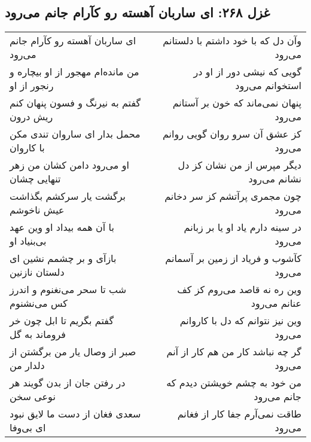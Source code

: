 \begin{center}
\section*{غزل ۲۶۸: ای ساربان آهسته رو کآرام جانم می‌رود}
\label{sec:268}
\begin{longtable}{l p{0.5cm} r}
ای ساربان آهسته رو کآرام جانم می‌رود
&&
وآن دل که با خود داشتم با دلستانم می‌رود
\\
من مانده‌ام مهجور از او بیچاره و رنجور از او
&&
گویی که نیشی دور از او در استخوانم می‌رود
\\
گفتم به نیرنگ و فسون پنهان کنم ریش درون
&&
پنهان نمی‌ماند که خون بر آستانم می‌رود
\\
محمل بدار ای ساروان تندی مکن با کاروان
&&
کز عشق آن سرو روان گویی روانم می‌رود
\\
او می‌رود دامن کشان من زهر تنهایی چشان
&&
دیگر مپرس از من نشان کز دل نشانم می‌رود
\\
برگشت یار سرکشم بگذاشت عیش ناخوشم
&&
چون مجمری پرآتشم کز سر دخانم می‌رود
\\
با آن همه بیداد او وین عهد بی‌بنیاد او
&&
در سینه دارم یاد او یا بر زبانم می‌رود
\\
بازآی و بر چشمم نشین ای دلستان نازنین
&&
کآشوب و فریاد از زمین بر آسمانم می‌رود
\\
شب تا سحر می‌نغنوم و اندرز کس می‌نشنوم
&&
وین ره نه قاصد می‌روم کز کف عنانم می‌رود
\\
گفتم بگریم تا ابل چون خر فروماند به گل
&&
وین نیز نتوانم که دل با کاروانم می‌رود
\\
صبر از وصال یار من برگشتن از دلدار من
&&
گر چه نباشد کار من هم کار از آنم می‌رود
\\
در رفتن جان از بدن گویند هر نوعی سخن
&&
من خود به چشم خویشتن دیدم که جانم می‌رود
\\
سعدی فغان از دست ما لایق نبود ای بی‌وفا
&&
طاقت نمی‌آرم جفا کار از فغانم می‌رود
\\
\end{longtable}
\end{center}
